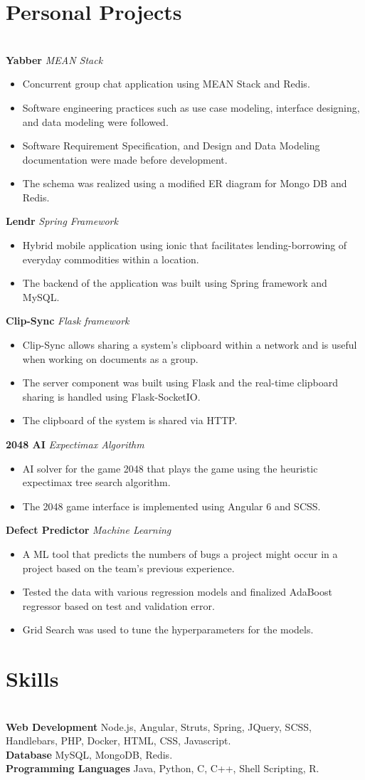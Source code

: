 \documentclass{resume}
\begin{document}
\section*{Personal Projects}
\titlerule
\noindent
\\
\textbf{Yabber} \hfill \textit{MEAN Stack}
\begin{itemize}
  \item Concurrent group chat application using MEAN Stack and Redis.
  \item Software engineering practices such as use case modeling, interface designing, and data modeling were followed.
  \item Software Requirement Specification, and Design and Data Modeling documentation were made before development.
  \item The schema was realized using a modified ER diagram for Mongo DB and Redis.
\end{itemize}
\textbf{Lendr} \hfill \textit{Spring Framework}
\begin{itemize}
  \item Hybrid mobile application using ionic that facilitates lending-borrowing of everyday commodities within a location.
  \item The backend of the application was built using Spring framework and MySQL.
\end{itemize}
\textbf{Clip-Sync} \hfill \textit{Flask framework}
\begin{itemize}
  \item Clip-Sync allows sharing a system's clipboard within a network and is useful when working on documents as a group.
  \item The server component was built using Flask and the real-time clipboard sharing is handled using Flask-SocketIO.
  \item The clipboard of the system is shared via HTTP.
\end{itemize}
\textbf{2048 AI} \hfill \textit{Expectimax Algorithm}
\begin{itemize}
  \item AI solver for the game 2048 that plays the game using the heuristic expectimax tree search algorithm.
  \item The 2048 game interface is implemented using Angular 6 and SCSS.
\end{itemize}
\textbf{Defect Predictor} \hfill \textit{Machine Learning}
\begin{itemize}
  \item A ML tool that predicts the numbers of bugs a project might occur in a project based on the team's previous experience.
  \item Tested the data with various regression models and finalized AdaBoost regressor based on test and validation error.
  \item Grid Search was used to tune the hyperparameters for the models.
\end{itemize}
\section*{Skills}
\titlerule
\noindent
\\
\textbf{Web Development} Node.js, Angular, Struts, Spring, JQuery, SCSS, Handlebars, PHP, Docker, HTML, CSS, Javascript. \\
\textbf{Database} MySQL, MongoDB, Redis. \\
\textbf{Programming Languages} Java, Python, C, C++, Shell Scripting, R.\\
\end{document}

